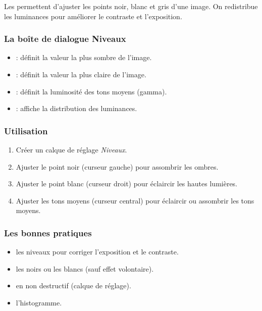 Les  permettent d'ajuster les points noir, blanc et gris d'une image. On redistribue les luminances pour améliorer le contraste et l'exposition.

\subsubsection{La boîte de dialogue Niveaux}

\begin{itemize}
    \item {} : définit la valeur la plus sombre de l'image.
    \item {} : définit la valeur la plus claire de l'image.
    \item {} : définit la luminosité des tons moyens (gamma).
    \item {} : affiche la distribution des luminances.
\end{itemize}

\subsubsection{Utilisation}

\begin{enumerate}
    \item Créer un calque de réglage \emph{Niveaux}.
    \item Ajuster le point noir (curseur gauche) pour assombrir les ombres.
    \item Ajuster le point blanc (curseur droit) pour éclaircir les hautes lumières.
    \item Ajuster les tons moyens (curseur central) pour éclaircir ou assombrir les tons moyens.
\end{enumerate}

\subsubsection{Les bonnes pratiques}

\begin{itemize}
    \item {} les niveaux pour corriger l'exposition et le contraste.
    \item {} les noirs ou les blancs (sauf effet volontaire).
    \item {} en non destructif (calque de réglage).
    \item {} l'histogramme.
\end{itemize}


